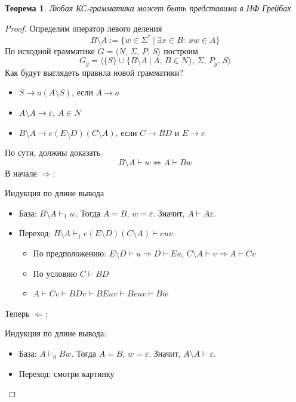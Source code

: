 \documentclass[a4paper,12pt]{article}
\theoremstyle{plain}
\newtheorem{theorem}{Теорема}[subsection]
\theoremstyle{definition}
\theoremstyle{remark}
\begin{document}
\begin{theorem}
	Любая КС-грамматика может быть представима в НФ Грейбах
\end{theorem}

\begin{proof}
	Определим оператор левого деления
	\[
		B \setminus A := \{w \in \Sigma^* \:\vert\: \exists x \in B :\: xw \in A\}
	\]
	По исходной грамматике $G = \langle N,\, \Sigma,\, P,\, S\rangle$ построим
	\[
		G_g = \langle\{S\} \cup \{B \setminus A \:\vert\: A,\, B \in N\},\, \Sigma,\, P_g,\, S\rangle
	\]
	Как будут выглядеть правила новой грамматики?
	\begin{itemize}
		\item $S \to a(A \setminus S)$, если $A \to a$
		\item $A \setminus A \to \varepsilon,\, A \in N$
		\item $B \setminus A \to e(E \setminus D)(C \setminus A)$, если $C \to BD$ и $E \to e$
	\end{itemize}
	По сути, должны доказать
	\[
		B \setminus A \vdash w \Leftrightarrow A \vdash Bw
	\]
	В начале $\Rightarrow$:

	Индукция по длине вывода
	\begin{itemize}
		\item База: $B \setminus A \vdash_1 w$. Тогда $A = B,\, w = \varepsilon$. Значит, $A \vdash A\varepsilon$.
		\item Переход: $B \setminus A \vdash_1 e(E \setminus D)(C \setminus A) \vdash euv$.
		      \begin{itemize}
			      \item По предположению: $E \setminus D \vdash u \Rightarrow D \vdash Eu$, $C \setminus A \vdash v \Rightarrow A \vdash Cv$
			      \item По условию $C \vdash BD$
			      \item $A \vdash Cv \vdash BDv \vdash BEuv \vdash Beuv \vdash Bw$
		      \end{itemize}
	\end{itemize}
	Теперь $\Leftarrow$:

	Индукция по длине вывода:
	\begin{itemize}
		\item База: $A \vdash_0 Bw$. Тогда $A = B,\, w = \varepsilon$. Значит, $A \setminus A \vdash \varepsilon$.
		\item Переход: смотри картинку


\end{itemize}
\end{proof}
\end{document}
